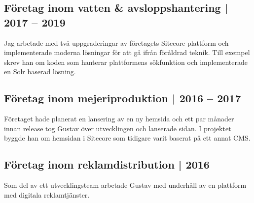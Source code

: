 \documentclass[usenames,dvipsnames]{article}
\begin{document}
\subsection*{\textcolor{NavyBlue}{Företag inom vatten \& avsloppshantering | 2017 -- 2019}}
\begin{flushleft}
Jag arbetade med två uppgraderingar av företagets Sitecore plattform och implementerade moderna lösningar för att gå ifrån föråldrad teknik. Till exempel skrev han om koden som hanterar plattformens sökfunktion och implementerade en Solr baserad lösning. 
\end{flushleft}

\subsection*{\textcolor{NavyBlue}{Företag inom mejeriproduktion | 2016 -- 2017}}
\begin{flushleft}
Företaget hade planerat en lansering av en ny hemsida och ett par månader innan release tog Gustav över utvecklingen och lanserade sidan. I projektet byggde han om hemsidan i Sitecore som tidigare varit baserat på ett annat CMS.  
\end{flushleft}

\subsection*{\textcolor{NavyBlue}{Företag inom reklamdistribution | 2016}}
\begin{flushleft}
Som del av ett utvecklingsteam arbetade Gustav med underhåll av en plattform med digitala reklamtjänster.
\end{flushleft}
\end{document}
